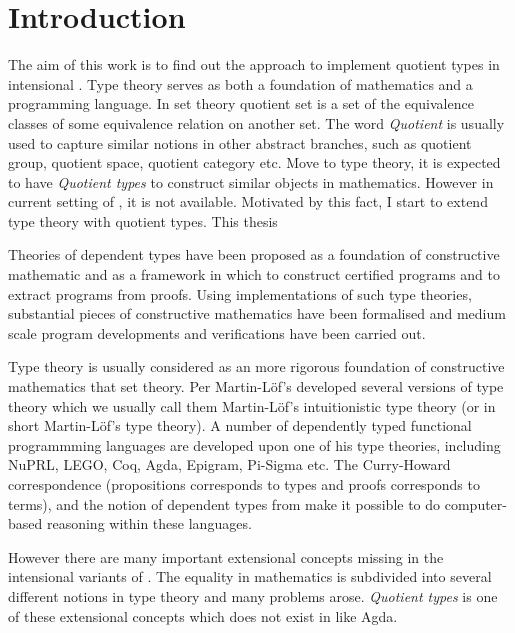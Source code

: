 \chapter{Introduction}

The aim of this work is to find out the approach to implement quotient
types in intensional \mltt. Type theory serves as both a foundation of
mathematics and a programming language. In set theory quotient set is
a set of the equivalence classes of some equivalence relation on
another set. The word \emph{Quotient} is usually used to capture
similar notions in other abstract branches, such as quotient group,
quotient space, quotient category etc. Move to type theory, it is
expected to have \emph{Quotient types} to construct similar objects in
mathematics. However in current setting of \itt, it is not
available. Motivated by this fact, I start to extend type theory with
quotient types. This thesis 







Theories of dependent types have been proposed as a foundation of constructive mathematic and as a framework in which to construct certified programs and to extract programs from proofs. Using implementations of such type theories, substantial pieces of constructive mathematics have been formalised and medium scale program developments and verifications have been carried out.

Type theory is usually considered as an more rigorous foundation of
constructive mathematics that set theory. Per Martin-L\"{o}f's developed several
versions of type theory which we usually call them Martin-Löf's
intuitionistic type theory (or in short Martin-Löf's type theory). A number of
dependently typed functional programmming languages are developed upon
one of his type theories, including NuPRL, LEGO, Coq, Agda, Epigram, Pi-Sigma etc.
The Curry-Howard correspondence (propositions corresponds to types and
proofs corresponds to terms), and the notion of dependent types from
\mltt make it possible to do computer-based reasoning within these
languages.

However there are many important extensional concepts missing in the
intensional variants of \mltt. The equality in mathematics is
subdivided into several different notions in type theory and many
problems arose.
\emph{Quotient types} is one of these extensional
concepts which does not exist in \itt like Agda. 

